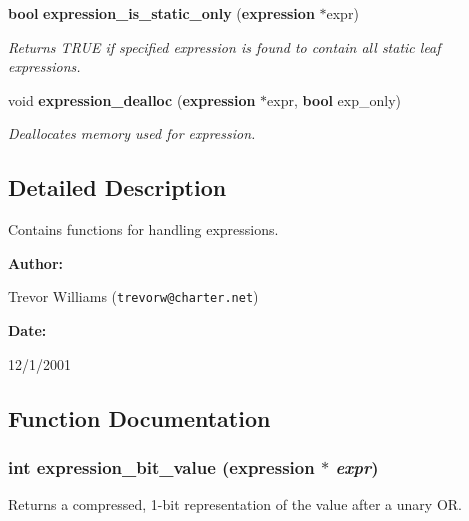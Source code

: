 \begin{CompactItemize}
{\bf bool} {\bf expression\_\-is\_\-static\_\-only} ({\bf expression} $\ast$expr)
\begin{CompactList}\small\item\em Returns TRUE if specified expression is found to contain all static leaf expressions.\item\end{CompactList}\item 
void {\bf expression\_\-dealloc} ({\bf expression} $\ast$expr, {\bf bool} exp\_\-only)
\begin{CompactList}\small\item\em Deallocates memory used for expression.\item\end{CompactList}\end{CompactItemize}


\subsection{Detailed Description}
Contains functions for handling expressions.



\begin{Desc}
\item[{\bf Author: }]\par
Trevor Williams ({\tt trevorw@charter.net}) \end{Desc}
\begin{Desc}
\item[{\bf Date: }]\par
12/1/2001

\end{Desc}


\subsection{Function Documentation}
\subsubsection{\setlength{\rightskip}{0pt plus 5cm}int expression\_\-bit\_\-value ({\bf expression} $\ast$ {\em expr})}\label{expr_8h_a11}


Returns a compressed, 1-bit representation of the value after a unary OR.

